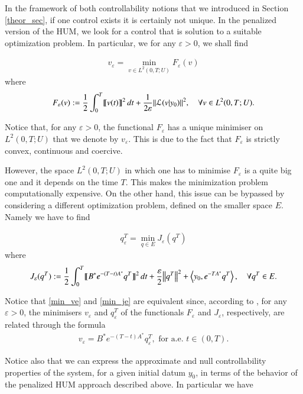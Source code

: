 In the framework of both controllability notions that we introduced in Section \ref{theor_sec}, if one control exists it is certainly not unique. In the penalized version of the HUM, we look for a control that is solution to a suitable optimization problem. In particular, we for any $\varepsilon>0$, we shall find

\begin{align}\label{min_ve}
	v_\varepsilon=\min_{v\in L^2(0,T;U)} F_\varepsilon (v)
\end{align}
where
\begin{align*}
	F_\varepsilon(v):=\frac{1}{2}\int_0^T\llbracket v(t)\rrbracket^2\,dt+\frac{1}{2\varepsilon}{\left\|\mathcal L(v|y_0)\right\|}_{}^2, \quad \forall v\in L^2(0,T;U).
\end{align*}

Notice that, for any $\varepsilon > 0$, the functional $F_\varepsilon$ has a unique minimiser on $L^2(0,T;U)$  that we denote by $v_\varepsilon$. This is due to the fact that $F_\varepsilon$ is strictly convex, continuous and coercive. 

However, the space $L^2(0,T;U)$ in which one has to minimise $F_\varepsilon$ is a quite big one and it depends on the time $T$. This makes the minimization problem computationally expensive. On the other hand, this issue can be bypassed by considering a different optimization problem, defined on the smaller space $E$. Namely we have to find  

\begin{align}\label{min_je}
	q^T_\varepsilon=\min_{q\in E} J_\varepsilon (q^T)
\end{align}
where
\begin{align}\label{penalized_fun}
	J_\varepsilon(q^T):=\frac{1}{2}\int_0^T\llbracket B^*e^{-(T-t)A^*}q^T\rrbracket^2\,dt+\frac{\varepsilon}{2}{\left\|q^T\right\|}_{}^2 + \left\langle y_0,e^{-TA^*}q^T\right\rangle, \quad \forall q^T\in E.
\end{align}

Notice that \eqref{min_ve} and \eqref{min_je} are equivalent since, according to \cite[Proposition 1.5]{boyer2013penalised}, for any $\varepsilon > 0$, the minimisers $v_\varepsilon$ and $q_\varepsilon^T$ of the functionals $F_\varepsilon$ and $J_\varepsilon$, respectively, are related through the formula
\begin{align*}
	v_\varepsilon = B^*e^{-(T-t)A^*}q_\varepsilon^T, \textrm{ for a.e. } t\in(0,T).
\end{align*} 

Notice also that we can express the approximate and null controllability properties of the system, for a given initial datum $y_0$, in terms of the behavior of the penalized HUM approach described above. In particular we have 

